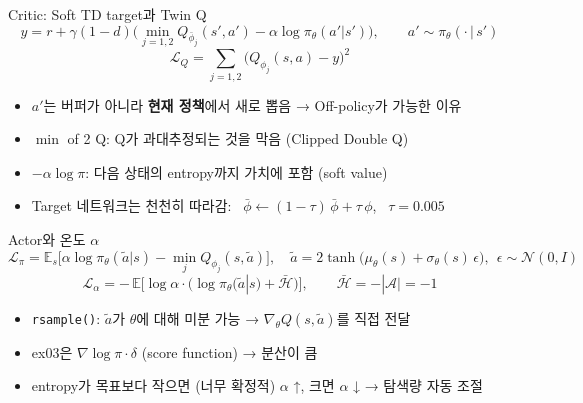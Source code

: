 \documentclass[aspectratio=169,11pt,xcolor=table]{beamer}
\newcommand{\cc}[1]{\texttt{#1}}
\begin{document}
\begin{frame}{Critic: Soft TD target과 Twin Q}
  \[
    y = r + \gamma (1-d) \Big( \min_{j=1,2} Q_{\bar\phi_j}(s', a') - \alpha \log \pi_\theta(a'|s') \Big),
    \qquad a' \sim \pi_\theta(\cdot\,|\,s')
  \]
  \[
    \mathcal{L}_Q = \sum_{j=1,2} \big( Q_{\phi_j}(s,a) - y \big)^2
  \]
  \vspace{0.1em}
  \begin{itemize}\small
    \item $a'$는 버퍼가 아니라 \textbf{현재 정책}에서 새로 뽑음 → Off-policy가 가능한 이유
    \item $\min$ of 2 Q: Q가 과대추정되는 것을 막음 (Clipped Double Q)
    \item $-\alpha\log\pi$: 다음 상태의 entropy까지 가치에 포함 (soft value)
    \item Target 네트워크는 천천히 따라감: \ $\bar\phi \leftarrow (1-\tau)\,\bar\phi + \tau\,\phi$, \ $\tau = 0.005$
  \end{itemize}
\end{frame}

\begin{frame}{Actor와 온도 $\alpha$}
  \[
    \mathcal{L}_\pi = \mathbb{E}_{s}\Big[ \alpha \log \pi_\theta(\tilde a|s) - \min_{j} Q_{\phi_j}(s, \tilde a) \Big],
    \quad \tilde a = 2\tanh\!\big(\mu_\theta(s) + \sigma_\theta(s)\,\epsilon\big),\ \ \epsilon \sim \mathcal{N}(0, I)
  \]
  \[
    \mathcal{L}_\alpha = -\,\mathbb{E}\Big[ \log\alpha \cdot \big( \log\pi_\theta(\tilde a|s) + \bar{\mathcal{H}} \big) \Big],
    \qquad \bar{\mathcal{H}} = -|\mathcal{A}| = -1
  \]
  \vspace{0.1em}
  \begin{itemize}\small
    \item \cc{rsample()}: $\tilde a$가 $\theta$에 대해 미분 가능 → $\nabla_\theta Q(s,\tilde a)$를 직접 전달
    \item ex03은 $\nabla\log\pi \cdot \delta$ (score function) → 분산이 큼
    \item entropy가 목표보다 작으면 (너무 확정적) $\alpha$ ↑, 크면 $\alpha$ ↓ → 탐색량 자동 조절
  \end{itemize}
\end{frame}
\end{document}
